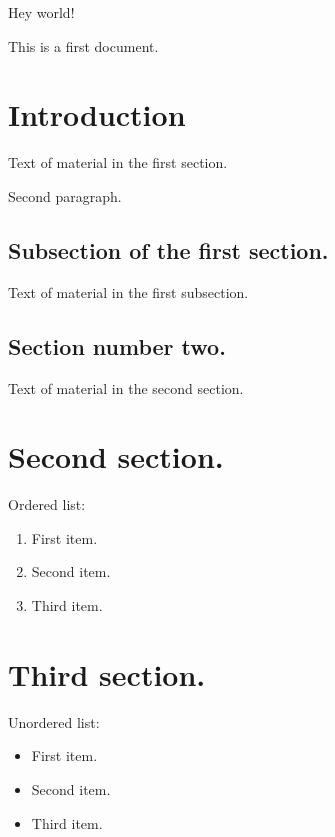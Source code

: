 \documentclass{article}
\begin{document}
Hey world!

This is a first document.

\section{Introduction}

Text of material in the first section.

Second paragraph.

\subsection{Subsection of the first section.}

Text of material in the first subsection.

\subsection*{Section number two.}

Text of material in the second section.

\section{Second section.}
Ordered list:
\begin{enumerate}
    \item First item.
    \item Second item.
    \item Third item.
\end{enumerate}
\section{Third section.}
Unordered list:
\begin{itemize}
    \item First item.
    \item Second item.
    \item Third item.
\end{itemize}
\end{document}
